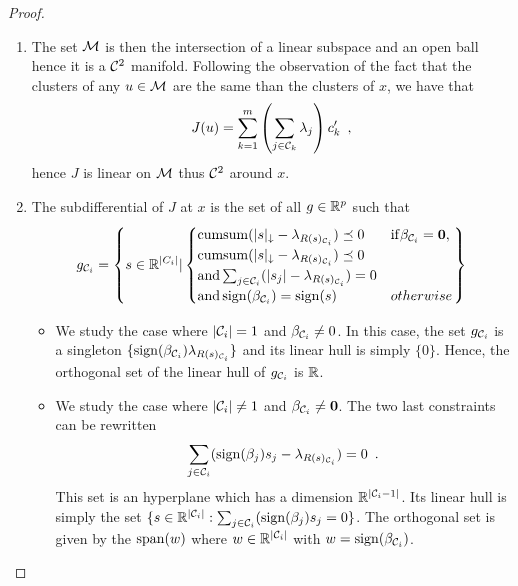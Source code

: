 \begin{proof}
\begin{enumerate}
  \item The set $\mathcal{M}$ is then the intersection of a linear subspace and an open ball hence it is a $\mathcal{C}^2$ manifold. 
  Following the observation of the fact that the clusters of any $u\in\mathcal{M}$ are the same than the clusters of $x$, we have that 
  \begin{align}{}
    J(u) = \sum_{k=1}^m \left( \sum_{j \in \mathcal{C}_k} \lambda_j \right)c_k' \enspace ,
  \end{align}
  hence $J$ is linear on $\mathcal{M}$ thus $\mathcal{C}^2$ around $x$. 
  \item The subdifferential of $J$ at $x$ is the set of all $g\in\mathbb{R}^p$ such that 
  \begin{align}
    g_{\mathcal{C}_i} = \left \{ s \in \mathbb{R}^{|C_i|} | 
    \begin{cases}
      \mathrm{cumsum}(|s|_{\downarrow} - \lambda_{R(s)_{\mathcal{C}_i}}) \preceq 0 & \mathrm{if } \beta_{\mathcal{C}_i} = \textbf{0}, \\
      \mathrm{cumsum}(|s|_{\downarrow} - \lambda_{R(s)_{\mathcal{C}_i}}) \preceq 0 \\
      \mathrm{ and } \sum_{j\in \mathcal{C}_i} (|s_j| - \lambda_{R(s)_{\mathcal{C}_i}}) = 0 \\
      \mathrm{ and } \operatorname{sign}(\beta_{\mathcal{C}_i}) =  \operatorname{sign}(s) & otherwise
    \end{cases}
    \right \} \nonumber
  \end{align}
 
\begin{itemize}

  \item We study the case where $|\mathcal{C}_i|=1$  and $\beta_{\mathcal{C}_i}\neq 0$. In this case, the set $g_{\mathcal{C}_i}$ is a singleton $\{\operatorname{sign}(\beta_{\mathcal{C}_i})\lambda_{R(s)_{\mathcal{C}_i}}\}$ and its linear hull is simply $\{0\}$. Hence, the orthogonal set of the linear hull of $g_{\mathcal{C}_i}$ is $\mathbb{R}$. 

  \item We study the case where $|\mathcal{C}_i|\neq 1$  and $\beta_{\mathcal{C}_i}\neq \textbf{0}$.
  The two last constraints can be rewritten
  \begin{align}
    \sum_{j\in \mathcal{C}_i} (\operatorname{sign}(\beta_j)s_j - \lambda_{R(s)_{\mathcal{C}_i}}) = 0 \nonumber \enspace .
  \end{align}
  This set is an hyperplane which has a dimension $\mathbb{R}^{|\mathcal{C}_i - 1|}$. Its linear hull is simply the set $\{s\in\mathbb{R}^{|\mathcal{C}_i|} : \sum_{j\in \mathcal{C}_i} (\operatorname{sign}(\beta_j)s_j = 0\}$. 
  The orthogonal set is given by the $\operatorname{span}(w)$ where $w\in\mathbb{R}^{|\mathcal{C}_i|}$ with $w = \operatorname{sign}(\beta_{\mathcal{C}_i})$.


\end{itemize}
\end{enumerate}
\end{proof}
